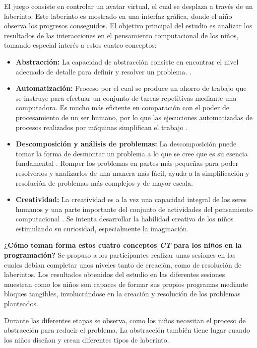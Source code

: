 El juego consiste en controlar un avatar virtual, el cual se desplaza a través de un laberinto. Este laberinto es mostrado en una interfaz gráfica, donde el niño observa los progresos conseguidos. El objetivo principal del estudio es analizar los resultados de las interacciones en el pensamiento computacional de los niños, tomando especial interés a estos cuatro conceptos:
\begin{itemize}
\item \textbf{Abstracción:} La capacidad de abstracción consiste en encontrar el nivel adecuado de detalle para definir y resolver un problema. \cite{Heureux}.
\item \textbf{Automatización:} Proceso por el cual se produce un ahorro de trabajo que se instruye para efectuar un conjunto de tareas repetitivas mediante una computadora. Es mucho más eficiente en comparación con el poder de procesamiento de un ser humano, por lo que las ejecuciones automatizadas de procesos realizados por máquinas simplifican el trabajo \cite{Guzdial}.
\item \textbf{Descomposición y análisis de problemas:} La descomposición puede tomar la forma de desmontar un problema a lo que se cree que es su esencia fundamental \cite{Lee}. Romper los problemas en partes más pequeñas para poder resolverlos y analizarlos de una manera más fácil, ayuda a la simplificación y resolución de problemas más complejos y de mayor escala.
\item \textbf{Creatividad:} La creatividad es a la vez una capacidad integral de los seres humanos y una parte importante del conjunto de actividades del pensamiento computacional \cite{Curzon}. Se intenta desarrollar la habilidad creativa de los niños estimulando su curiosidad, especialmente la imaginación.
\end{itemize}

\textbf{¿Cómo toman forma estos cuatro conceptos \emph{CT} para los niños en la programación?}
Se propuso a los participantes realizar unas sesiones en las cuales debían completar unos niveles tanto de creación, como de resolución de laberintos.
Los resultados obtenidos del estudio en las diferentes sesiones muestran como los niños son capaces de formar sus propios programas mediante bloques tangibles, involucrándose en la creación y resolución de los problemas planteados. 

Durante las diferentes etapas se observa, como los niños necesitan el proceso de abstracción para reducir el problema. La abstracción también tiene lugar cuando los niños diseñan y crean diferentes tipos de laberinto. 

